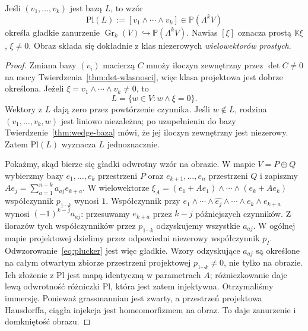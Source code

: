 \begin{twierdzenie}
\label{thm:grass-plucker}
Jeśli $(v_1,\ldots,v_k)$ jest bazą $L$, to wzór
\begin{equation}\label{eq:plucker}
 \mathrm{Pl}(L):=[v_1\wedge\cdots\wedge v_k]
 \in\mathbb P(\Lambda^k V)
\end{equation}
określa gładkie zanurzenie
$\operatorname{Gr}_k(V)\hookrightarrow\mathbb P(\Lambda^k V)$.
Nawias $[\xi]$ oznacza prostą $\mathbb K\xi$,
$\xi\ne0$. Obraz składa się dokładnie z klas
niezerowych \emph{wielowektorów prostych}.
\end{twierdzenie}
\begin{proof}
Zmiana bazy $(v_i)$ macierzą $C$ mnoży iloczyn
zewnętrzny przez $\det C\ne0$ na mocy
Twierdzenia~\ref{thm:det-wlasnosci}, więc klasa
projektowa jest dobrze określona. Jeżeli
$\xi=v_1\wedge\cdots\wedge v_k\ne0$, to
\[
 L=\{w\in V:w\wedge\xi=0\}.
\]
Wektory z $L$ dają zero przez powtórzenie czynnika.
Jeśli $w\notin L$, rodzina $(v_1,\ldots,v_k,w)$
jest liniowo niezależna; po uzupełnieniu do bazy
Twierdzenie~\ref{thm:wedge-baza} mówi, że jej
iloczyn zewnętrzny jest niezerowy. Zatem
$\mathrm{Pl}(L)$ wyznacza $L$ jednoznacznie.

Pokażmy, skąd bierze się gładki odwrotny wzór na obrazie.
W mapie $V=P\oplus Q$ wybierzmy bazy
$e_1,\ldots,e_k$ przestrzeni $P$ oraz
$e_{k+1},\ldots,e_n$ przestrzeni $Q$ i zapiszmy
$Ae_j=\sum_{a=1}^{n-k}a_{aj}e_{k+a}$.
W wielowektorze
$\xi_A=(e_1+Ae_1)\wedge\cdots\wedge(e_k+Ae_k)$
współczynnik $p_{1\cdots k}$ wynosi $1$.
Współczynnik przy
$e_1\wedge\cdots\wedge\widehat{e_j}\wedge\cdots
\wedge e_k\wedge e_{k+a}$ wynosi
$(-1)^{k-j}a_{aj}$: przesuwamy $e_{k+a}$
przez $k-j$ późniejszych czynników.
Z ilorazów tych współczynników przez $p_{1\cdots k}$
odzyskujemy wszystkie $a_{aj}$.
W ogólnej mapie projektowej dzielimy przez
odpowiedni niezerowy współczynnik $p_I$.
Odwzorowanie~\eqref{eq:plucker} jest więc gładkie.
Wzory odzyskujące $a_{aj}$ są określone na całym otwartym
zbiorze przestrzeni projektowej $p_{1\cdots k}\ne0$, nie tylko
na obrazie. Ich złożenie z $\mathrm{Pl}$ jest mapą identyczną
w parametrach $A$; różniczkowanie daje lewą odwrotność różniczki
$\mathrm{Pl}$, która jest zatem injektywna.
Otrzymaliśmy immersję. Ponieważ grassmannian jest zwarty,
a przestrzeń projektowa Hausdorffa, ciągła injekcja jest
homeomorfizmem na obraz. To daje zanurzenie i domkniętość obrazu.
\end{proof}

